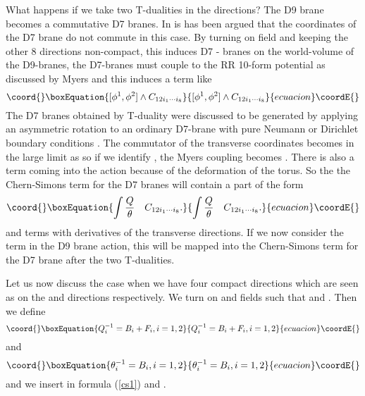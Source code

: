 \documentclass[a4paper,12pt]{article}
\begin{document}
What happens if we take two T-dualities in the \coordHE{} directions?
The D9 brane becomes a commutative D7 branes. 
In \cite{chu,blu1} is has been argued that the coordinates
\coordHE{} of the D7 brane do not commute in this case. 
By turning on \coordHE{} field and keeping the other 8 directions non-compact,
this induces D7 - branes on the world-volume of the D9-branes, the D7-branes
must couple to the RR 10-form potential as discussed by Myers \cite{mye1}
and this induces a term like
\begin{equation}\coord{}\boxEquation{
[\phi^{1}, \phi^{2}] \wedge C_{12 i_1 \cdots i_8}
}{
[\phi^{1}, \phi^{2}] \wedge C_{12 i_1 \cdots i_8}
}{ecuacion}\coordE{}\end{equation}
The D7 branes obtained by T-duality were discussed to be generated by applying 
an asymmetric rotation to an ordinary D7-brane with pure Neumann or Dirichlet
boundary conditions \cite{chu,blu1}. 
The commutator of the transverse coordinates becomes in
the large \coordHE{} limit as \coordHE{} so if we identify
\coordHE{}, the Myers coupling becomes
 \coordHE{}. 
There is also a term \coordHE{} coming
into the action because of the deformation of the torus.
So the  the Chern-Simons term for the D7 branes will
contain a part of the form 
\begin{equation}\coord{}\boxEquation{
\label{d7}
\int \frac{Q}{\theta} \quad C_{12 i_1 \cdots i_8}.
}{
\int \frac{Q}{\theta} \quad C_{12 i_1 \cdots i_8}.
}{ecuacion}\coordE{}\end{equation}
and terms with derivatives of the transverse directions.
If we now consider the term \coordHE{} in the D9 brane 
action, this will be mapped into the Chern-Simons term for the D7 brane
after the two T-dualities.

Let us now discuss the case when we have four compact directions which are
seen as \coordHE{} on the \coordHE{} and \coordHE{} directions 
respectively. We turn on \coordHE{} and \coordHE{} fields such that 
\coordHE{} and 
\coordHE{}.
Then we define 
\begin{equation}\coord{}\boxEquation{
Q_{i}^{-1} = B_{i} + F_{i}, i = 1, 2
}{
Q_{i}^{-1} = B_{i} + F_{i}, i = 1, 2
}{ecuacion}\coordE{}\end{equation} 
and 
\begin{equation}\coord{}\boxEquation{
\theta_{i}^{-1} = B_{i}, i = 1, 2
}{
\theta_{i}^{-1} = B_{i}, i = 1, 2
}{ecuacion}\coordE{}\end{equation}
and we insert in formula (\ref{cs1}) \coordHE{}
and \coordHE{}. 
\end{document}
